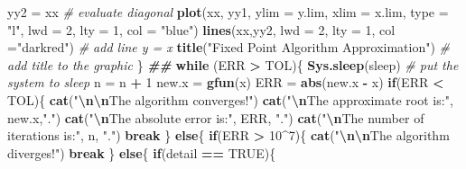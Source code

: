 \documentclass[
]{book}
\newenvironment{Shaded}{\begin{snugshade}}{\end{snugshade}}
\newcommand{\AttributeTok}[1]{\textcolor[rgb]{0.13,0.29,0.53}{#1}}
\newcommand{\CommentTok}[1]{\textcolor[rgb]{0.56,0.35,0.01}{\textit{#1}}}
\newcommand{\ConstantTok}[1]{\textcolor[rgb]{0.56,0.35,0.01}{#1}}
\newcommand{\ControlFlowTok}[1]{\textcolor[rgb]{0.13,0.29,0.53}{\textbf{#1}}}
\newcommand{\DecValTok}[1]{\textcolor[rgb]{0.00,0.00,0.81}{#1}}
\newcommand{\DocumentationTok}[1]{\textcolor[rgb]{0.56,0.35,0.01}{\textbf{\textit{#1}}}}
\newcommand{\FunctionTok}[1]{\textcolor[rgb]{0.13,0.29,0.53}{\textbf{#1}}}
\newcommand{\NormalTok}[1]{#1}
\newcommand{\OtherTok}[1]{\textcolor[rgb]{0.56,0.35,0.01}{#1}}
\newcommand{\SpecialCharTok}[1]{\textcolor[rgb]{0.81,0.36,0.00}{\textbf{#1}}}
\newcommand{\StringTok}[1]{\textcolor[rgb]{0.31,0.60,0.02}{#1}}
\begin{document}
\begin{Shaded}
\begin{Highlighting}[]
\NormalTok{ yy2 }\OtherTok{=}\NormalTok{ xx                                               }\CommentTok{\# evaluate diagonal}
 \FunctionTok{plot}\NormalTok{(xx, yy1, }\AttributeTok{ylim =}\NormalTok{ y.lim, }\AttributeTok{xlim =}\NormalTok{ x.lim, }\AttributeTok{type =} \StringTok{"l"}\NormalTok{, }\AttributeTok{lwd =} \DecValTok{2}\NormalTok{, }\AttributeTok{lty =} \DecValTok{1}\NormalTok{, }\AttributeTok{col =} \StringTok{"blue"}\NormalTok{)}
 \FunctionTok{lines}\NormalTok{(xx,yy2, }\AttributeTok{lwd =} \DecValTok{2}\NormalTok{, }\AttributeTok{lty =} \DecValTok{1}\NormalTok{, }\AttributeTok{col =}\StringTok{"darkred"}\NormalTok{)        }\CommentTok{\# add line y = x}
 \FunctionTok{title}\NormalTok{(}\StringTok{"Fixed Point Algorithm Approximation"}\NormalTok{)           }\CommentTok{\# add title to the graphic}
\NormalTok{ \}}
\DocumentationTok{\#\# }
 \ControlFlowTok{while}\NormalTok{ (ERR }\SpecialCharTok{\textgreater{}}\NormalTok{ TOL)\{}
  \FunctionTok{Sys.sleep}\NormalTok{(sleep)                                      }\CommentTok{\# put the system to sleep}
\NormalTok{  n }\OtherTok{=}\NormalTok{ n }\SpecialCharTok{+} \DecValTok{1}
\NormalTok{  new.x }\OtherTok{=} \FunctionTok{gfun}\NormalTok{(x)}
\NormalTok{  ERR }\OtherTok{=} \FunctionTok{abs}\NormalTok{(new.x }\SpecialCharTok{{-}}\NormalTok{ x)}
  \ControlFlowTok{if}\NormalTok{(ERR }\SpecialCharTok{\textless{}}\NormalTok{ TOL)\{}
    \FunctionTok{cat}\NormalTok{(}\StringTok{"}\SpecialCharTok{\textbackslash{}n\textbackslash{}n}\StringTok{The algorithm converges!"}\NormalTok{)}
    \FunctionTok{cat}\NormalTok{(}\StringTok{"}\SpecialCharTok{\textbackslash{}n}\StringTok{The approximate root is:"}\NormalTok{, new.x,}\StringTok{"."}\NormalTok{)}
    \FunctionTok{cat}\NormalTok{(}\StringTok{"}\SpecialCharTok{\textbackslash{}n}\StringTok{The absolute error is:"}\NormalTok{, ERR, }\StringTok{"."}\NormalTok{)}
    \FunctionTok{cat}\NormalTok{(}\StringTok{"}\SpecialCharTok{\textbackslash{}n}\StringTok{The number of iterations is:"}\NormalTok{, n, }\StringTok{"."}\NormalTok{)}
    \ControlFlowTok{break}
\NormalTok{  \} }\ControlFlowTok{else}\NormalTok{\{}
    \ControlFlowTok{if}\NormalTok{(ERR }\SpecialCharTok{\textgreater{}} \DecValTok{10}\SpecialCharTok{\^{}}\DecValTok{7}\NormalTok{)\{}
        \FunctionTok{cat}\NormalTok{(}\StringTok{"}\SpecialCharTok{\textbackslash{}n\textbackslash{}n}\StringTok{The algorithm diverges!"}\NormalTok{)}
        \ControlFlowTok{break}
\NormalTok{    \} }\ControlFlowTok{else}\NormalTok{\{}
         \ControlFlowTok{if}\NormalTok{(detail }\SpecialCharTok{==} \ConstantTok{TRUE}\NormalTok{)\{}

\end{Highlighting}
\end{Shaded}
\end{document}
